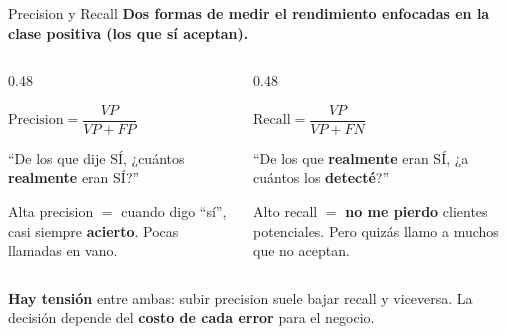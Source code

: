 \documentclass[aspectratio=169, 11pt]{beamer}
\begin{document}
\begin{frame}[shrink=5]{Precision y Recall}
  \vspace{-4pt}
  {\footnotesize\color{arcaDark}\bfseries
    Dos formas de medir el rendimiento \textbf{enfocadas en la clase positiva}
    (los que sí aceptan).}

  \vspace{6pt}
  \begin{columns}[T]
    \begin{column}{0.48\textwidth}
      \begin{center}
        \begin{tcolorbox}[colback=arcaGray, colframe=arcaRed, boxrule=0.8pt,
                          arc=3pt, width=\textwidth]
        \centering
        \footnotesize
        $\text{Precision} = \dfrac{VP}{VP + FP}$
        \end{tcolorbox}
      \end{center}
      \vspace{4pt}
      {\scriptsize
      ``De los que dije SÍ, ¿cuántos \textbf{realmente} eran SÍ?''

      \vspace{4pt}
      Alta precision $=$ cuando digo ``sí'', casi siempre
      \textbf{acierto}. Pocas llamadas en vano.
      }
    \end{column}

    \begin{column}{0.48\textwidth}
      \begin{center}
        \begin{tcolorbox}[colback=arcaGray, colframe=arcaRed, boxrule=0.8pt,
                          arc=3pt, width=\textwidth]
        \centering
        \footnotesize
        $\text{Recall} = \dfrac{VP}{VP + FN}$
        \end{tcolorbox}
      \end{center}
      \vspace{4pt}
      {\scriptsize
      ``De los que \textbf{realmente} eran SÍ, ¿a cuántos los
      \textbf{detecté}?''

      \vspace{4pt}
      Alto recall $=$ \textbf{no me pierdo} clientes potenciales.
      Pero quizás llamo a muchos que no aceptan.
      }
    \end{column}
  \end{columns}

  \vspace{8pt}
  {\footnotesize\color{arcaDark}
    \faLightbulb\hspace{4pt}
    \textbf{Hay tensión} entre ambas: subir precision suele bajar recall
    y viceversa. La decisión depende del \textbf{costo de cada error}
    para el negocio.}
\end{frame}
\end{document}
